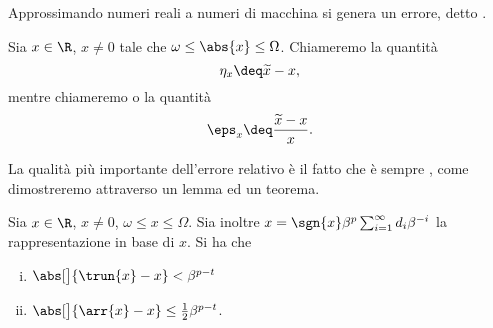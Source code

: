 Approssimando numeri reali a numeri di macchina si genera un errore, detto .

\begin{definition}
     Sia $x \in \R$, $x \neq 0$ tale che $\omega \leq \abs{x} \leq \Omega$. Chiameremo  la quantità \[
        \eta_x \deq \tilde{x} - x,
    \] mentre chiameremo  o  la quantità \[
        \eps_x \deq \frac{\tilde{x} - x}{x}.
    \]
\end{definition}

La qualità più importante dell'errore relativo è il fatto che è sempre , come dimostreremo attraverso un lemma ed un teorema.

\begin{lemma}
    \label{lem:lim_sup_abserr} 
    Sia $x \in \R$, $x \neq 0$, $\omega \leq x \leq \Omega$. Sia inoltre $x = \sgn{x}\beta^p\sum_{i=1}^\infty d_i\beta^{-i}$ la rappresentazione in base di $x$. Si ha che 
    \begin{enumerate}[(i)]
        \item $\abs[\big]{\trun{x} - x} < \beta^{p-t}$
        \item $\abs[\big]{\arr{x} - x} \leq \frac12\beta^{p-t}$.  
    \end{enumerate}
\end{lemma}
